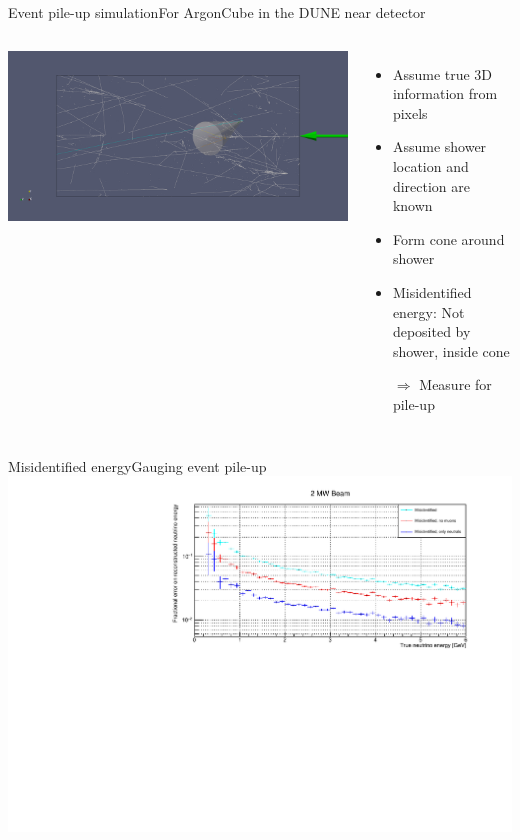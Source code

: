 \documentclass[]{beamer}
\newcommand*{\emphcol}{red}
\newcommand*{\emphcoltitle}{blue}
\newcommand*{\AC}{{ArgonCube}}
\newcommand*{\dune}{{DUNE}}
\begin{document}
\begin{frame}{Event pile-up simulation}{For \AC{} in the \dune{} near detector}
	\begin{columns}[c]
		\centering
		\includegraphics[viewport=4800 1700 6300 2700, clip, width=\textwidth]{defence/uid0_spill6_event461_gamma19_x}
		\begin{itemize}
			\item {\color{\emphcol} Assume true 3D information from pixels}
			\item Assume shower location and direction are known
			\item {\color{\emphcol} Form cone around shower}
			\item Misidentified energy: Not deposited by shower, inside cone
			\item[$\Rightarrow$] Measure for pile-up
		\end{itemize}
	\end{columns}
\end{frame}

\begin{frame}{Misidentified energy}{\color{\emphcoltitle}Gauging event pile-up}
	\centering
	\includegraphics[width=\textwidth]{pile-up/2MW/misid_rel_x}
\end{frame}
\end{document}
